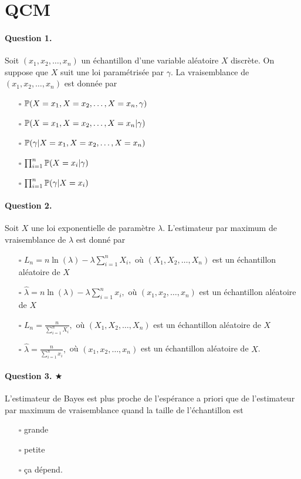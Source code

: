 
\section{QCM}
\paragraph{Question 1.} Soit $(x_1, x_2, \dots, x_n)$ un échantillon d'une
variable aléatoire $X$ discrète. On suppose que $X$ suit une loi paramétrisée
par $\gamma$. La vraisemblance de $(x_1, x_2, \dots, x_n)$ est donnée par
\begin{itemize}
\item[$\square$] $\mathbb{P}(X=x_1, X=x_2, \dots, X=x_n, \gamma)$
\item[$\square$] $\mathbb{P}(X=x_1, X=x_2, \dots, X=x_n | \gamma)$
\item[$\square$] $\mathbb{P}(\gamma | X=x_1, X=x_2, \dots, X=x_n)$
\item[$\square$] $\prod_{i=1}^n \mathbb{P}(X=x_i|\gamma)$
\item[$\square$] $\prod_{i=1}^n \mathbb{P}(\gamma|X=x_i)$
\end{itemize}

\paragraph{Question 2.} Soit $X$ une loi exponentielle de paramètre
$\lambda$. L'estimateur par maximum de vraisemblance de $\lambda$ est donné par
\begin{itemize}
\item[$\square$] $L_n = n \ln(\lambda) - \lambda \sum_{i=1}^n X_i,$ où $(X_1, X_2, \dots, X_n)$ est un échantillon aléatoire de $X$
\item[$\square$] $\widehat{\lambda} = n \ln(\lambda) - \lambda \sum_{i=1}^n x_i,$ où $(x_1, x_2, \dots, x_n)$ est un échantillon aléatoire de $X$
\item[$\square$] $L_n = \frac{n}{\sum_{i=1}^n X_i},$ où $(X_1, X_2, \dots, X_n)$ est un échantillon aléatoire de $X$
\item[$\square$] $\widehat{\lambda} = \frac{n}{\sum_{i=1}^n x_i},$ où $(x_1, x_2, \dots, x_n)$ est un échantillon aléatoire de $X$.
\end{itemize}

\paragraph{Question 3. $\bigstar$} L'estimateur de Bayes est plus proche de l'espérance a
priori que de l'estimateur par maximum de vraisemblance quand la taille de
l'échantillon est
\begin{itemize}
\item[$\square$] grande
\item[$\square$] petite
\item[$\square$] ça dépend.
\end{itemize}



